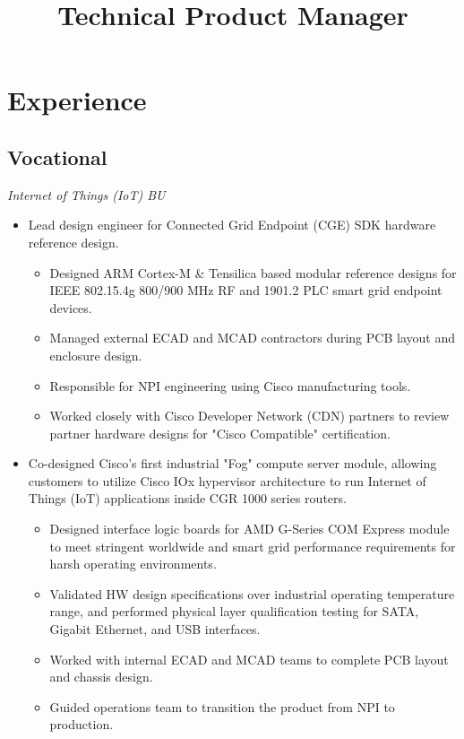 \documentclass[11pt,a4paper]{moderncv}
\title{Technical Product Manager}
\begin{document}
\makecvtitle

\section{Experience}
\subsection{Vocational}
{
  \textit{Internet of Things (IoT) BU}
  \begin{itemize}
  \item Lead design engineer for Connected Grid Endpoint (CGE) SDK hardware reference design.
    \begin{itemize}
      \item Designed ARM Cortex-M \& Tensilica based modular reference designs for IEEE 802.15.4g 800/900 MHz RF and 1901.2 PLC smart grid endpoint devices.
      \item Managed external ECAD and MCAD contractors during PCB layout and enclosure design.
      \item Responsible for NPI engineering using Cisco manufacturing tools.
      \item Worked closely with Cisco Developer Network (CDN) partners to review partner hardware designs for "Cisco Compatible" certification.
    \end{itemize}
  \item Co-designed Cisco's first industrial "Fog" compute server module, allowing customers to utilize Cisco IOx hypervisor architecture to run Internet of Things (IoT) applications inside CGR 1000 series routers.
    \begin{itemize}
      \item Designed interface logic boards for AMD G-Series COM Express module to meet stringent worldwide and smart grid performance requirements for harsh operating environments.
      \item Validated HW design specifications over industrial operating temperature range, and performed physical layer qualification testing for SATA, Gigabit Ethernet, and USB interfaces.
      \item Worked with internal ECAD and MCAD teams to complete PCB layout and chassis design.
      \item Guided operations team to transition the product from NPI to production.

\end{itemize}
\end{itemize}}
\end{document}
